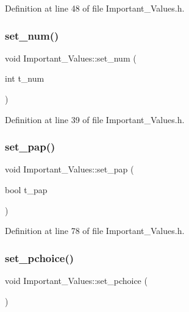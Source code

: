 Definition at line 48 of file Important\+\_\+\+Values.\+h.

\mbox{\label{class_important___values_ab9c05e7bed46d38efd119f644e2fcffd}} 
\subsubsection{\texorpdfstring{set\_num()}{set\_num()}}
{\footnotesize\ttfamily void Important\+\_\+\+Values\+::set\+\_\+num (\begin{DoxyParamCaption}\item[{int}]{t\+\_\+num }\end{DoxyParamCaption})\hspace{0.3cm}{\ttfamily [inline]}}



Definition at line 39 of file Important\+\_\+\+Values.\+h.

\mbox{\label{class_important___values_a54afaefb62f9b363438d917d92fc8fab}} 
\subsubsection{\texorpdfstring{set\_pap()}{set\_pap()}}
{\footnotesize\ttfamily void Important\+\_\+\+Values\+::set\+\_\+pap (\begin{DoxyParamCaption}\item[{bool}]{t\+\_\+pap }\end{DoxyParamCaption})\hspace{0.3cm}{\ttfamily [inline]}}



Definition at line 78 of file Important\+\_\+\+Values.\+h.

\mbox{\label{class_important___values_a6c6d4f85b3e59b527ae5376236dd117a}} 
\subsubsection{\texorpdfstring{set\_pchoice()}{set\_pchoice()}\hspace{0.1cm}{\footnotesize\ttfamily [1/2]}}
{\footnotesize\ttfamily void Important\+\_\+\+Values\+::set\+\_\+pchoice (\begin{DoxyParamCaption}{ }\end{DoxyParamCaption})\hspace{0.3cm}{\ttfamily [inline]}}



